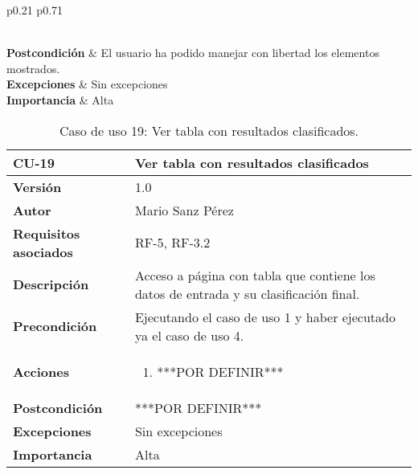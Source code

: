 \begin{table}[p]
\begin{tabularx}{\linewidth}{ p{0.21\columnwidth} p{0.71\columnwidth} }
\begin{enumerate}
		\end{enumerate}\\
		\textbf{Postcondición}        & El usuario ha podido manejar con libertad los elementos mostrados. \\
		\textbf{Excepciones}          & Sin excepciones \\
		\textbf{Importancia}          & Alta \\
		\bottomrule
	\end{tabularx}
	\caption{Caso de uso 5: Controlar visualizaciones (grafos).}
\end{table}


\begin{table}[p]
	\centering
	\begin{tabularx}{\linewidth}{ p{} p{} }
		\toprule
		\textbf{CU-19}    & \textbf{Ver tabla con resultados clasificados}\\
		\toprule
		\textbf{Versión}              & 1.0    \\
		\textbf{Autor}                & Mario Sanz Pérez \\
		\textbf{Requisitos asociados} & RF-5, RF-3.2 \\
		\textbf{Descripción}          & Acceso a página con tabla que contiene los datos de entrada y su clasificación final. \\
		\textbf{Precondición}         & Ejecutando el caso de uso 1 y haber ejecutado ya el caso de uso 4. \\
		\textbf{Acciones}             &
		\begin{enumerate}
			\def\labelenumi{\arabic{enumi}.}
			\tightlist
			\item ***POR DEFINIR***
		\end{enumerate}\\
		\textbf{Postcondición}        & ***POR DEFINIR*** \\
		\textbf{Excepciones}          & Sin excepciones \\
		\textbf{Importancia}          & Alta \\
		\bottomrule
	\end{tabularx}
	\caption{Caso de uso 19: Ver tabla con resultados clasificados.}
\end{table}

